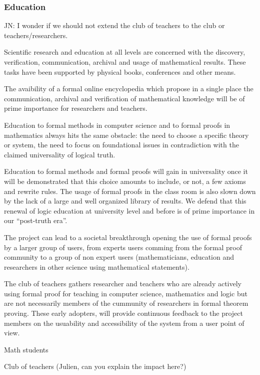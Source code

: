 \subsubsection{Education}

{\color{red} JN: I wonder if we should not extend the club of teachers to the club or teachers/researchers.}

Scientific research and education at all levels are concerned with the discovery, verification, communication, archival and usage of mathematical results.
These tasks have been supported by physical books, conferences and other means.

The avaibility of a formal online encyclopedia which propose in a single place the communication, archival and verification of mathematical  knowledge will be of prime importance for researchers and teachers.

Education to formal methods in computer science and to formal proofs
in mathematics always hits the same obstacle: the need to choose a
specific theory or system, the need to focus on foundational issues in contradiction with the claimed universality of logical truth. 

Education to formal methods and formal proofs will gain in universality once it will be demonstrated that this choice amounts to include, or not, a few axioms and rewrite
rules. 
The usage of formal proofs in the class room is also slown down by the lack of a large and well organized library of results.
We defend that this renewal of logic education at university level and before is of prime importance in our ``post-truth era''.

The project can lead to a societal breakthrough opening the use of formal proofs by a larger group of users, from experts users comming from the formal proof community  to a group of non expert users (mathematicians, education and researchers in other science using mathematical statements). 

The club of teachers gathers researcher and teachers who are already actively using formal proof for teaching in computer science, mathematics and logic but are not necessarily members of the cummunity of researchers in formal theorem proving. These early adopters, will provide continuous feedback to the project members on the usuability and accessibility of the system from a user point of view.

Math students 

{\color{red} Club of teachers (Julien, can you explain the impact here?)}

